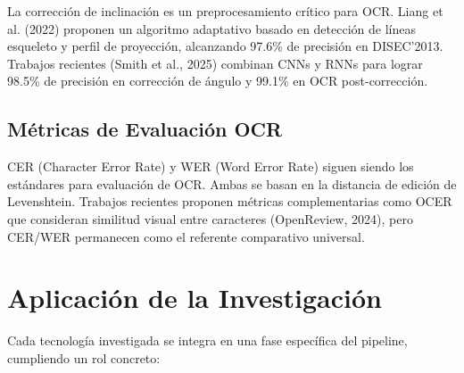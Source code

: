 \documentclass[11pt, a4paper]{article}
\begin{document}
La corrección de inclinación es un preprocesamiento crítico para OCR. Liang et al. (2022) proponen un algoritmo adaptativo basado en detección de líneas esqueleto y perfil de proyección, alcanzando 97.6\% de precisión en DISEC'2013. Trabajos recientes (Smith et al., 2025) combinan CNNs y RNNs para lograr 98.5\% de precisión en corrección de ángulo y 99.1\% en OCR post-corrección.

\subsection{Métricas de Evaluación OCR}

CER (Character Error Rate) y WER (Word Error Rate) siguen siendo los estándares para evaluación de OCR. Ambas se basan en la distancia de edición de Levenshtein. Trabajos recientes proponen métricas complementarias como OCER que consideran similitud visual entre caracteres (OpenReview, 2024), pero CER/WER permanecen como el referente comparativo universal.

\section{Aplicación de la Investigación}

Cada tecnología investigada se integra en una fase específica del pipeline, cumpliendo un rol concreto:
\end{document}
